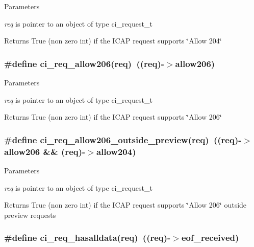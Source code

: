 \begin{DoxyParams}{Parameters}
\item[{\em req}]is pointer to an object of type ci\_\-request\_\-t \end{DoxyParams}
\begin{DoxyReturn}{Returns}
True (non zero int) if the ICAP request supports \char`\"{}Allow 204\char`\"{} 
\end{DoxyReturn}
\hypertarget{group__REQUEST_ga96465be5046df471fc12aead53450577}{
\subsubsection[{ci\_\-req\_\-allow206}]{\setlength{\rightskip}{0pt plus 5cm}\#define ci\_\-req\_\-allow206(req)~((req)-\/$>$allow206)}}
\label{group__REQUEST_ga96465be5046df471fc12aead53450577}

\begin{DoxyParams}{Parameters}
\item[{\em req}]is pointer to an object of type ci\_\-request\_\-t \end{DoxyParams}
\begin{DoxyReturn}{Returns}
True (non zero int) if the ICAP request supports \char`\"{}Allow 206\char`\"{} 
\end{DoxyReturn}
\hypertarget{group__REQUEST_ga275b5e800b461574d3da66b22fbd0a29}{
\subsubsection[{ci\_\-req\_\-allow206\_\-outside\_\-preview}]{\setlength{\rightskip}{0pt plus 5cm}\#define ci\_\-req\_\-allow206\_\-outside\_\-preview(req)~((req)-\/$>$allow206 \&\& (req)-\/$>$allow204)}}
\label{group__REQUEST_ga275b5e800b461574d3da66b22fbd0a29}

\begin{DoxyParams}{Parameters}
\item[{\em req}]is pointer to an object of type ci\_\-request\_\-t \end{DoxyParams}
\begin{DoxyReturn}{Returns}
True (non zero int) if the ICAP request supports \char`\"{}Allow 206\char`\"{} outside preview requests 
\end{DoxyReturn}
\hypertarget{group__REQUEST_ga0b1cadb60f6d198af3a04cc13442c3cb}{
\subsubsection[{ci\_\-req\_\-hasalldata}]{\setlength{\rightskip}{0pt plus 5cm}\#define ci\_\-req\_\-hasalldata(req)~((req)-\/$>$eof\_\-received)}}
\label{group__REQUEST_ga0b1cadb60f6d198af3a04cc13442c3cb}

